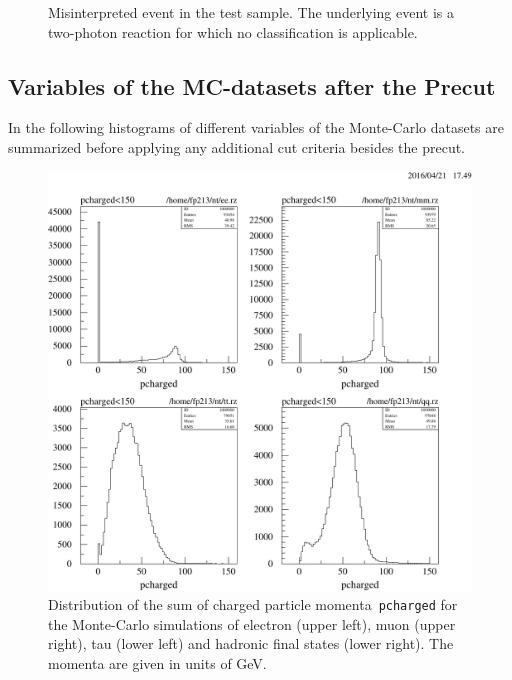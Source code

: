 \documentclass[11pt, a4paper]{article}
\numberwithin{equation}{section}
\begin{document}
\begin{appendix}
\begin{figure}[h]
\begin{subfigure}{\textwidth}
	\end{subfigure}
	\caption{Misinterpreted event in the test sample. The underlying event is a two-photon reaction for which no classification is applicable.}
	\label{fig:2photon}
\end{figure}

\clearpage
\subsection{Variables of the MC-datasets after the Precut}
\label{app:uncut_mc}
In the following histograms of different variables of the Monte-Carlo datasets are summarized before applying any additional cut criteria besides the precut.

\begin{figure}[h]
	\centering
	\includegraphics[width=1\textwidth]{./data/tag2/uncut/cropped/pcharged_uncut.pdf}
	\caption{Distribution of the sum of charged particle momenta~\texttt{pcharged} for the Monte-Carlo simulations of electron (upper left), muon (upper right), tau (lower left) and hadronic final states (lower right). The momenta are given in units of GeV.}
\end{figure}


\end{appendix}
\end{document}
